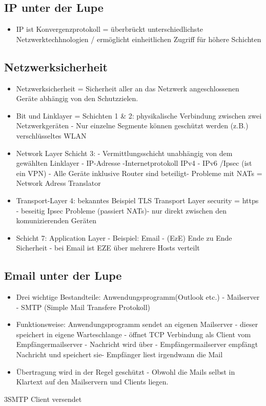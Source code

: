 \documentclass[a4paper,10pt]{scrartcl}
\begin{document}
\subsection{IP unter der Lupe}

\begin{itemize}
 \item IP ist Konvergenzprotokoll = überbrückt unterschiedlichste Netzwerktechhnologien / ermöglicht einheitlichen Zugriff für höhere Schichten
\end{itemize}

\subsection{Netzwerksicherheit}

\begin{itemize}
 \item Netzwerksicherheit = Sicherheit aller an das Netzwerk angeschlossenen Geräte abhängig von den Schutzzielen.
 \item Bit und Linklayer = Schichten 1 \& 2: physikalische Verbindung zwischen zwei Netzwerkgeräten - Nur einzelne Segmente können geschützt 
 werden (z.B.) verschlüsseltes WLAN
 \item Network Layer Schicht 3: - Vermittlungsschicht unabhängig von dem gewählten Linklayer - IP-Adresse -Internetprotokoll IPv4 - IPv6 /Ipsec (ist ein VPN) - 
 Alle Geräte inklusive Router sind beteiligt- Probleme mit NATs = Network Adress Translator
 \item Transport-Layer 4: bekanntes Beispiel TLS Transport Layer security = https - beseitig Ipsec Probleme (passiert NATs)- nur direkt zwischen den komunizierenden
 Geräten
 \item Schicht 7: Application Layer - Beispiel: Email - (EzE) Ende zu Ende Sicherheit - bei Email ist EZE über mehrere Hosts verteilt
\end{itemize}

\subsection{Email unter der Lupe}

\begin{itemize}
 \item Drei wichtige Bestandteile: Anwendungsprogramm(Outlook etc.) - Mailserver - SMTP (Simple Mail Transfere Protokoll)
 \item Funktionsweise: Anwendungsprogramm sendet an eigenen Mailserver - dieser speichert in eigene Warteschlange - öffnet TCP Verbindung als Client vom Empfängermailserver -
 Nachricht wird über - Empfängermailserver empfängt Nachricht und speichert sie- Empfänger liest irgendwann die Mail
 \item Übertragung wird in der Regel geschützt - Obwohl die Mails selbst in Klartext auf den Mailservern und Clients liegen.
\end{itemize}3SMTP Client versendet
\end{document}

